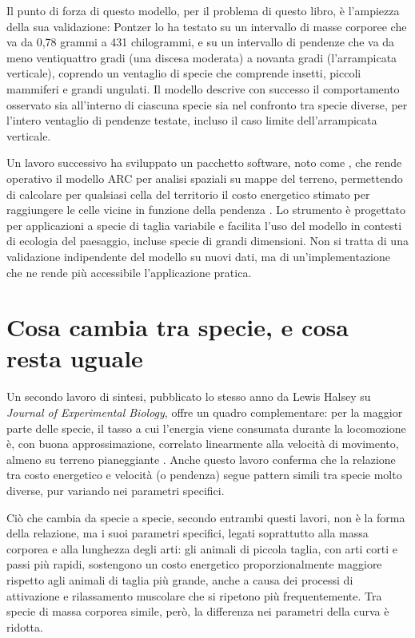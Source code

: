 Il punto di forza di questo modello, per il problema di questo libro, è l'ampiezza della sua validazione: Pontzer lo ha testato su un intervallo di masse corporee che va da 0,78 grammi a 431 chilogrammi, e su un intervallo di pendenze che va da meno ventiquattro gradi (una discesa moderata) a novanta gradi (l'arrampicata verticale), coprendo un ventaglio di specie che comprende insetti, piccoli mammiferi e grandi ungulati. Il modello descrive con successo il comportamento osservato sia all'interno di ciascuna specie sia nel confronto tra specie diverse, per l'intero ventaglio di pendenze testate, incluso il caso limite dell'arrampicata verticale.

Un lavoro successivo ha sviluppato un pacchetto software, noto come , che rende operativo il modello ARC per analisi spaziali su mappe del terreno, permettendo di calcolare per qualsiasi cella del territorio il costo energetico stimato per raggiungere le celle vicine in funzione della pendenza \citep{berti2022}. Lo strumento è progettato per applicazioni a specie di taglia variabile e facilita l'uso del modello in contesti di ecologia del paesaggio, incluse specie di grandi dimensioni. Non si tratta di una validazione indipendente del modello su nuovi dati, ma di un'implementazione che ne rende più accessibile l'applicazione pratica.

\section{Cosa cambia tra specie, e cosa resta uguale}

Un secondo lavoro di sintesi, pubblicato lo stesso anno da Lewis Halsey su \textit{Journal of Experimental Biology}, offre un quadro complementare: per la maggior parte delle specie, il tasso a cui l'energia viene consumata durante la locomozione è, con buona approssimazione, correlato linearmente alla velocità di movimento, almeno su terreno pianeggiante \citep{halsey2016}. Anche questo lavoro conferma che la relazione tra costo energetico e velocità (o pendenza) segue pattern simili tra specie molto diverse, pur variando nei parametri specifici.

Ciò che cambia da specie a specie, secondo entrambi questi lavori, non è la forma della relazione, ma i suoi parametri specifici, legati soprattutto alla massa corporea e alla lunghezza degli arti: gli animali di piccola taglia, con arti corti e passi più rapidi, sostengono un costo energetico proporzionalmente maggiore rispetto agli animali di taglia più grande, anche a causa dei processi di attivazione e rilassamento muscolare che si ripetono più frequentemente. Tra specie di massa corporea simile, però, la differenza nei parametri della curva è ridotta.

